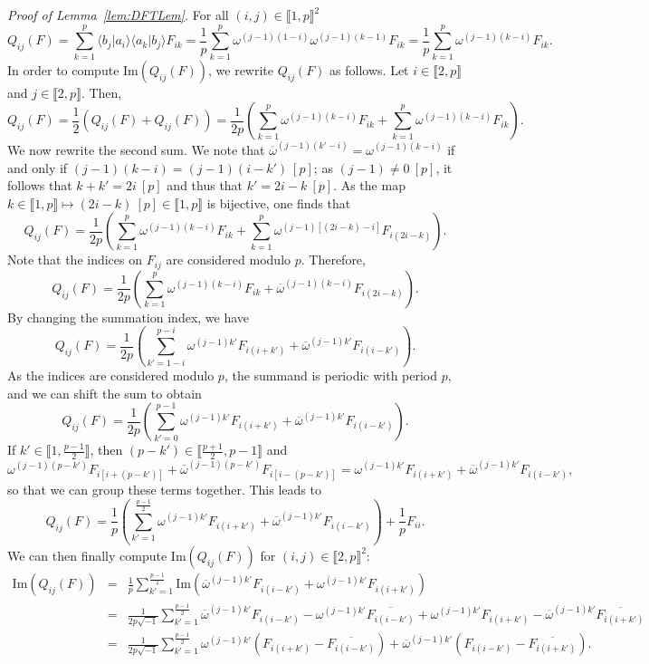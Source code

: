 \documentclass[a4paper, notitlepage, 11pt]{article}
\numberwithin{equation}{section}
\newcommand{\bra}[1]{\langle #1|}
\newcommand{\cket}[1]{|#1\rangle}
\newcommand{\bracket}[2]{\langle #1|#2\rangle}
\renewcommand{\Im}[1]{\mathrm{Im}#1}
\newcommand{\IntEnt}[2]{\llbracket #1 , #2 \rrbracket}
\begin{document}
\noindent \emph{Proof of Lemma~\ref{lem:DFTLem}.}
 For all $(i,j)\in\IntEnt{1}{p}^2$
\[
Q_{ij}(F) = \sum_{k=1}^{p} \bracket{b_j}{a_i}\bracket{a_k}{b_j}F_{ik} = \frac{1}{p} \sum_{k=1}^{p}\omega^{(j-1)(1-i)}\omega^{(j-1)(k-1)}F_{i k} = \frac{1}{p} \sum_{k=1}^{p}\omega^{(j-1)(k-i)}F_{i k}.
\]
In order to compute $\Im(Q_{ij}(F))$, we rewrite $Q_{ij}(F)$ as follows.
Let $i\in\IntEnt{2}{p}$ and $j\in\IntEnt{2}{p}$. Then, 
\[
Q_{ij}(F) =\frac1{2}\left(Q_{ij}(F)+Q_{ij}(F)\right)=\frac{1}{2p} \left(\sum_{k=1}^{p}\omega^{(j-1)(k-i)}F_{i k} + \sum_{k=1}^{p}\omega^{(j-1)(k-i)}F_{i k}\right).
\]
We now rewrite the second sum. We note that 
$\overline{\omega}^{(j-1)(k'-i)} = \omega^{(j-1)(k-i)}$ if and only if $(j-1)(k-i)=(j-1)(i-k') \ [p]$;  as $(j-1)\neq 0~[p]$, it follows that $k+k'=2i~[p]$ and thus {that} $k'=2i-k~[p]$. As the map $k\in \IntEnt{1}{p} \mapsto (2i-k)~[p]\in\IntEnt{1}{p}$ is bijective, one finds {that}
\[
Q_{ij}(F) = \frac{1}{2p} \left(\sum_{k=1}^{p}\omega^{(j-1)(k-i)}F_{i k}+ \sum_{k=1}^{p}\omega^{(j-1)[(2i-k)-i]}F_{i (2i-k)}\right).
\]
 Note that the indices on $F_{ij}$ are considered modulo $p$. Therefore,
\begin{equation}\label{eq:DFT5}
Q_{ij}(F) =\displaystyle\frac{1}{2p} \left(\sum_{k=1}^{p}\omega^{(j-1)(k-i)}F_{i k}+\overline{\omega}^{(j-1)(k-i)}F_{i (2i-k)}\right).
\end{equation}
By changing the summation index, we {have} 
\[
Q_{ij}(F) =\frac{1}{2p} \left(\sum_{k'=1-i}^{p-i}\omega^{(j-1)k'}F_{i (i+k')}+\overline{\omega}^{(j-1)k'}F_{i (i-k')}\right).
\]
As the indices are considered modulo $p$, the summand is periodic with period $p$, and we can shift the sum to obtain
\[
Q_{ij}(F) =\frac{1}{2p} \left(\sum_{k'=0}^{p-1}\omega^{(j-1)k'}F_{i (i+k')}+\overline{\omega}^{(j-1)k'}F_{i (i-k')}\right).
\]
If $k'\in\IntEnt{1}{\frac{p-1}{2}}$, then $(p-k')\in\IntEnt{\frac{p+1}{2}}{p-1}$ and
\[
\omega^{(j-1)(p-k')}F_{i [i+(p-k')]}+\overline{\omega}^{(j-1)(p-k')}F_{i [i-(p-k')]} = \omega^{(j-1)k'}F_{i (i+k')}+\overline{\omega}^{(j-1)k'}F_{i (i-k')},
\]
so that we can group these terms together. This leads to
\begin{equation}\label{eq:DFTQij}
Q_{ij}(F) =\frac{1}{p} \left(\sum_{k'=1}^{\frac{p-1}{2}}\omega^{(j-1)k'}F_{i (i+k')}+\overline{\omega}^{(j-1)k'}F_{i (i-k')}\right) + \frac{1}{p}F_{ii}.
\end{equation}
We can then finally compute $\text{Im}(Q_{ij}(F))$ for $(i,j)\in\IntEnt{2}{p}^2$:
\[
\begin{array}{rcl}
\text{Im}\left(Q_{ij}(F)\right)  &=&  \displaystyle \frac{1}{p} \sum_{k'=1}^{\frac{p-1}{2}}\text{Im}\left(\overline{\omega}^{(j-1)k'}F_{i (i-k')}+\omega^{(j-1)k'}F_{i (i+k')}\right) \\
&=& \displaystyle \frac{1}{2p\sqrt{-1}} \sum_{k'=1}^{\frac{p-1}{2}}\overline{\omega}^{(j-1)k'}F_{i (i-k')} - \omega^{(j-1)k'}\overline{F_{i (i-k')}} + \omega^{(j-1)k'}F_{i (i+k')} - \overline{\omega}^{(j-1)k'}\overline{F_{i (i+k')}} \\
&=& \displaystyle \frac{1}{2p\sqrt{-1}} \sum_{k'=1}^{\frac{p-1}{2}}\omega^{(j-1)k'}\left(F_{i (i+k')} - \overline{F_{i (i-k')}}\right) + \overline{\omega}^{(j-1)k'}\left(F_{i (i-k')}- \overline{F_{i (i+k')}}\right).
\end{array}
\]
\end{document}
